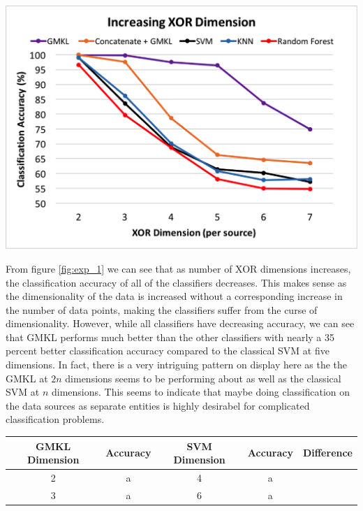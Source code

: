 \documentclass{article}
\begin{document}
\begin{minipage}{\textwidth}
\centering
\includegraphics[scale=0.4]{experimentpic1.png}
\label{fig:exp_1.png}
\end{minipage}


From figure \ref{fig:exp_1} we can see that as number of XOR dimensions increases, the classification accuracy of all of the classifiers decreases. This makes sense as the dimensionality of the data is increased without a corresponding increase in the number of data points, making the classifiers suffer from the curse of dimensionality. However, while all classifiers have decreasing accuracy, we can see that GMKL performs much better than the other classifiers with nearly a 35 percent better classification accuracy compared to the classical SVM at five dimensions. In fact, there is a very intriguing pattern on display here as the the GMKL at $2n$ dimensions seems to be performing about as well as the classical SVM at $n$ dimensions. This seems to indicate that maybe doing classification on the data sources as separate entities is highly desirabel for complicated classification problems.

\begin{minipage}{\textwidth}
\centering
\begin{tabular}{|c| c| c| c| c| }
\hline
GMKL Dimension & Accuracy & SVM Dimension & Accuracy & Difference \\
\hline
2 & a & 4 & a \\
\hline
3 & a & 6 &a
\end{tabular}
\end{minipage}
\end{document}
